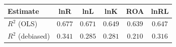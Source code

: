 \begin{tabular}{l*{5}{c}}
\hline\hline
 Estimate & lnR & lnL & lnK & ROA & lnRL \\
\hline
\addlinespace $ R^2$ (OLS) & $0.677$ & $0.671$ & $0.649$ & $0.639$ & $0.647$ \\
$ R^2$ (debiased) & $0.341$ & $0.285$ & $0.281$ & $0.210$ & $0.316$ \\
\hline\hline
\end{tabular}

